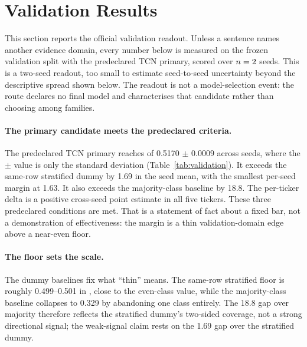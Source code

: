 \section{Validation Results}

This section reports the official validation readout. Unless a sentence names
another evidence domain, every number below is measured on the frozen
validation split with the predeclared TCN primary, scored over $n=2{}$
seeds. This is a two-seed readout, too small to estimate seed-to-seed
uncertainty beyond the descriptive spread shown below. The readout is
not a model-selection event: the route declares no final model and
characterises that candidate rather than choosing among families.

\paragraph{The primary candidate meets the predeclared criteria.}
The predeclared TCN primary reaches
\macrofone{} of 0.5170 \(\pm\) 0.0009 across \numseeds{} seeds, where the
\(\pm\) value is only the standard deviation
(Table~\ref{tab:validation}). It exceeds the same-row stratified dummy by
1.69\pp{} in the seed mean, with the smallest per-seed margin at 1.63\pp. It
also exceeds the majority-class baseline by 18.8\pp. The per-ticker delta is a
positive cross-seed point estimate in all five tickers. These three predeclared
conditions are met. That is a statement of fact about a fixed bar, not a
demonstration of effectiveness: the margin is a thin validation-domain edge
above a near-even floor.

\paragraph{The floor sets the scale.}
The dummy baselines fix what ``thin'' means. The same-row stratified floor is
roughly 0.499--0.501 in \macrofone{}, close to the even-class value,
while the majority-class baseline collapses to 0.329 by abandoning one class
entirely. The 18.8\pp{} gap over majority therefore reflects the stratified
dummy's two-sided coverage, not a strong directional signal; the weak-signal
claim rests on the 1.69\pp{} gap over the stratified dummy.

